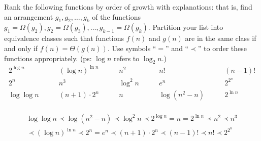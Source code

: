\begin{exercise}[]{Rank the following functions by order of growth with explanations: that is, find an arrangement $g_1, g_2, \ldots , g_{k}$ of the functions $g_1 = \Omega(g_2), g_2 = \Omega(g_3), \ldots, g_{k-1} = \Omega(g_{k})$.  Partition your list into equivalence classes such that functions $f(n)$ and $g(n)$ are in the same class if and only if $f(n) = \Theta(g(n))$. Use symbols ``$=$'' and ``$\prec$'' to order these functions appropriately. (ps: $\log n$ refers to $\log_2 n$.)$$
  \begin{array}{ccccc}
      2^{\log n} \quad & \quad (\log n)^{\ln n} \quad & \quad n^2 \quad & \quad n! \quad & \quad (n - 1)! \\
      2^n \quad & \quad n^3 \quad & \quad \log^2 n \quad & \quad e^n \quad & \quad 2^{2^n} \\
      \log\log n \quad & \quad (n+1)\cdot 2^n \quad & \quad n \quad & \quad \log {(n^2 - n)} \quad & \quad 2^{\ln n} \\
  \end{array}
  $$}
  \begin{solution}
  \begin{equation}
    \begin{aligned}
      \log\log n  \prec \log {(n^2 - n)} \prec \log^2 n \prec 2^{\log n} = n = 2^{\ln n}  \prec n^2 \prec n^3 \\ 
      \prec (\log n)^{\ln n} \prec 2^n = e^n \prec (n+1)\cdot 2^n \prec  (n-1)! \prec n! \prec  2^{2^n} 
    \end{aligned}
  \end{equation}
  \end{solution}
  \label{ex6}
\end{exercise}

